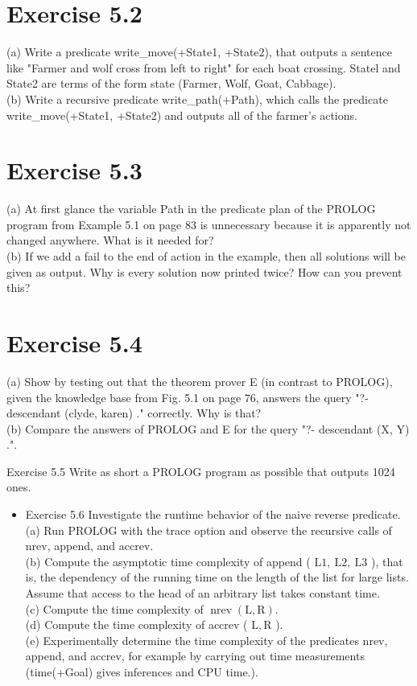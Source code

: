 \documentclass[10pt]{article}
\begin{document}
\section*{Exercise 5.2}
(a) Write a predicate write\_move(+State1, +State2), that outputs a sentence like "Farmer and wolf cross from left to right" for each boat crossing. Statel and State2 are terms of the form state (Farmer, Wolf, Goat, Cabbage).\\
(b) Write a recursive predicate write\_path(+Path), which calls the predicate write\_move(+State1, +State2) and outputs all of the farmer's actions.

\section*{Exercise 5.3}
(a) At first glance the variable Path in the predicate plan of the PROLOG program from Example 5.1 on page 83 is unnecessary because it is apparently not changed anywhere. What is it needed for?\\
(b) If we add a fail to the end of action in the example, then all solutions will be given as output. Why is every solution now printed twice? How can you prevent this?

\section*{Exercise 5.4}
(a) Show by testing out that the theorem prover E (in contrast to PROLOG), given the knowledge base from Fig. 5.1 on page 76, answers the query "?- descendant (clyde, karen) ." correctly. Why is that?\\
(b) Compare the answers of PROLOG and E for the query "?- descendant (X, Y) .".

Exercise 5.5 Write as short a PROLOG program as possible that outputs 1024 ones.

\begin{itemize}
  \item Exercise 5.6 Investigate the runtime behavior of the naive reverse predicate.\\
(a) Run PROLOG with the trace option and observe the recursive calls of nrev, append, and accrev.\\
(b) Compute the asymptotic time complexity of append ( $\mathrm{L} 1, \mathrm{~L} 2, \mathrm{~L} 3$ ), that is, the dependency of the running time on the length of the list for large lists. Assume that access to the head of an arbitrary list takes constant time.\\
(c) Compute the time complexity of $\operatorname{nrev}(\mathrm{L}, \mathrm{R})$.\\
(d) Compute the time complexity of accrev ( $\mathrm{L}, \mathrm{R}$ ).\\
(e) Experimentally determine the time complexity of the predicates nrev, append, and accrev, for example by carrying out time measurements (time(+Goal) gives inferences and CPU time.).
\end{itemize}
\end{document}
